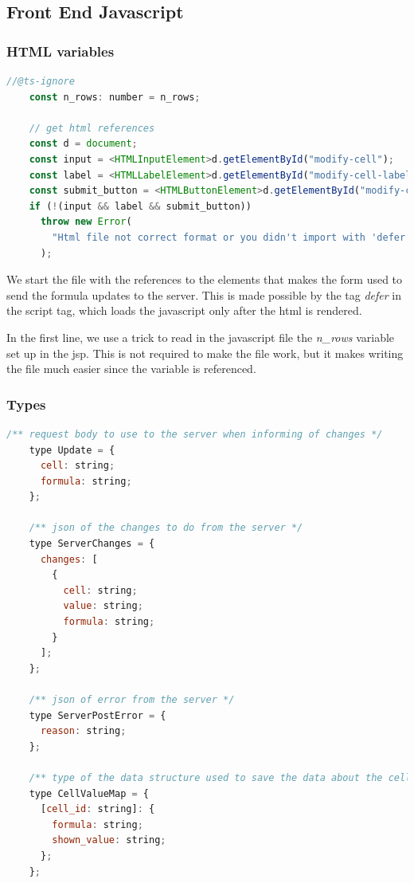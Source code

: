 \documentclass[12pt, a4paper]{article}
\begin{document}
  \subsection{Front End Javascript}
  \subsubsection{HTML variables}
  \begin{lstlisting}[language=javascript, caption={globals}]
    //@ts-ignore
    const n_rows: number = n_rows;

    // get html references
    const d = document;
    const input = <HTMLInputElement>d.getElementById("modify-cell");
    const label = <HTMLLabelElement>d.getElementById("modify-cell-label");
    const submit_button = <HTMLButtonElement>d.getElementById("modify-cell-submit");
    if (!(input && label && submit_button))
      throw new Error(
        "Html file not correct format or you didn't import with 'defer'"
      );
  \end{lstlisting}
  
  We start the file with the references to the elements that makes the form used to send the formula updates to the server. This is made possible by the tag \textit{defer} in the script tag, which loads the javascript only after the html is rendered.

  In the first line, we use a trick to read in the javascript file the \textit{n\_rows} variable set up in the jsp. This is not required to make the file work, but it makes writing the file much easier since the variable is referenced.

  \subsubsection{Types}
  \begin{lstlisting}[language=javascript, caption={types}]
    /** request body to use to the server when informing of changes */
    type Update = {
      cell: string;
      formula: string;
    };

    /** json of the changes to do from the server */
    type ServerChanges = {
      changes: [
        {
          cell: string;
          value: string;
          formula: string;
        }
      ];
    };

    /** json of error from the server */
    type ServerPostError = {
      reason: string;
    };

    /** type of the data structure used to save the data about the cells */
    type CellValueMap = {
      [cell_id: string]: {
        formula: string;
        shown_value: string;
      };
    };
  \end{lstlisting}
\end{document}
